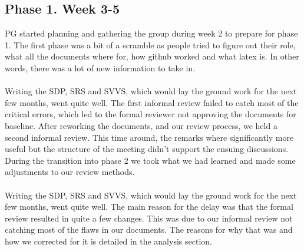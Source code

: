 \documentclass{article}
\begin{document}
    \subsection{Phase 1. Week 3-5 \label{phase1}}
        PG started planning and gathering the group during week 2 to prepare for phase 1.
        The first phase was a bit of a scramble as people tried to 
        figure out their role, what all the documents where for, how github worked and what latex is. 
        In other words, there was a lot of new information to take in.
        \\ \\
        Writing the SDP, SRS and SVVS, which would lay the ground work for the next few months, went quite well. The first informal
        review failed to catch most of the critical errors, which led to the formal reviewer not approving the documents for baseline. 
        After reworking the documents, and our review process, we held a second informal review. This time around, the remarks where 
        significantly more useful but the structure of the meeting didn't support the ensuing discussions. During the transition 
        into phase 2 we took what we had learned and made some adjustments to our review methods.
        \\ \\
        Writing the SDP, SRS and SVVS, which would lay the ground work for the next few months, went quite well. 
        The main reason for the delay was that the formal review resulted in quite a few changes. This was 
        due to our informal review not catching most of the flaws in our documents. The reasons for why that was and 
        how we corrected for it is detailed in the analysis section. 
        \\ \\
\end{document}
